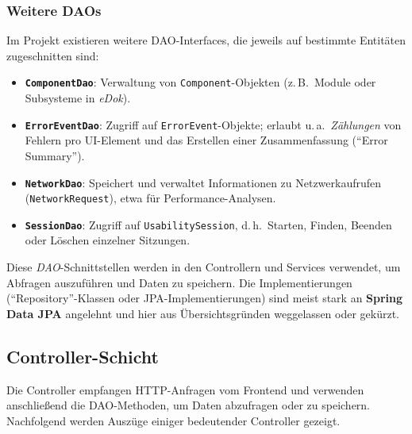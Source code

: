 \documentclass[12pt,oneside]{article}
\begin{document}
\subsubsection{Weitere DAOs}
Im Projekt existieren weitere DAO-Interfaces, die jeweils auf bestimmte Entitäten zugeschnitten sind:
\begin{itemize}
    \item \textbf{\lstinline|ComponentDao|}: Verwaltung von \lstinline|Component|-Objekten (z.\,B.\ Module oder Subsysteme in \textit{eDok}).
    \item \textbf{\lstinline|ErrorEventDao|}: Zugriff auf \lstinline|ErrorEvent|-Objekte; erlaubt u.\,a.\ \emph{Zählungen} von Fehlern pro UI-Element und das Erstellen einer Zusammenfassung (\enquote{Error Summary}).
    \item \textbf{\lstinline|NetworkDao|}: Speichert und verwaltet Informationen zu Netzwerkaufrufen (\lstinline|NetworkRequest|), etwa für Performance-Analysen.
    \item \textbf{\lstinline|SessionDao|}: Zugriff auf \lstinline|UsabilitySession|, d.\,h.\ Starten, Finden, Beenden oder Löschen einzelner Sitzungen.
\end{itemize}

\noindent
Diese \emph{DAO}-Schnittstellen werden in den Controllern und Services verwendet, um Abfragen auszuführen und Daten zu speichern. Die Implementierungen (\enquote{Repository}-Klassen oder JPA-Implementierungen) sind meist stark an \textbf{Spring Data JPA} angelehnt und hier aus Übersichtsgründen weggelassen oder gekürzt.

\subsection{Controller-Schicht}
Die Controller empfangen HTTP-Anfragen vom Frontend und verwenden anschließend die DAO-Methoden, um Daten abzufragen oder zu speichern. Nachfolgend werden Auszüge einiger bedeutender Controller gezeigt.
\end{document}
